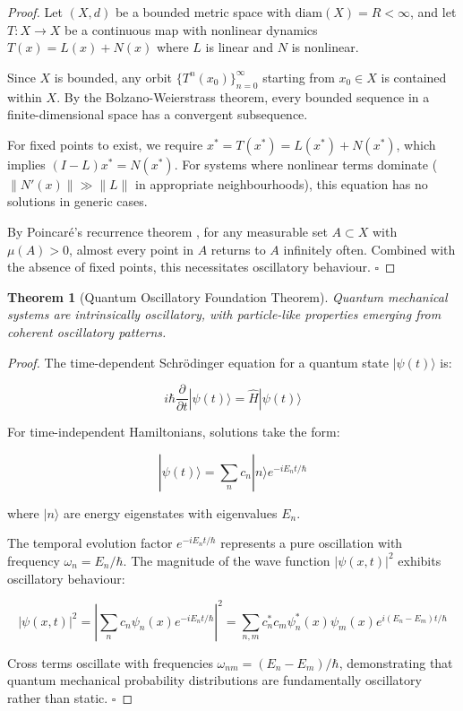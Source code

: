 \documentclass[11pt]{article}
\newtheorem{theorem}{Theorem}[section]
\theoremstyle{remark}
\begin{document}
\begin{proof}
Let $(X, d)$ be a bounded metric space with $\text{diam}(X) = R < \infty$, and let $T: X \to X$ be a continuous map with nonlinear dynamics $T(x) = L(x) + N(x)$ where $L$ is linear and $N$ is nonlinear.

Since $X$ is bounded, any orbit $\{T^n(x_0)\}_{n=0}^{\infty}$ starting from $x_0 \in X$ is contained within $X$. By the Bolzano-Weierstrass theorem, every bounded sequence in a finite-dimensional space has a convergent subsequence.

For fixed points to exist, we require $x^* = T(x^*) = L(x^*) + N(x^*)$, which implies $(I - L)x^* = N(x^*)$. For systems where nonlinear terms dominate ($\|N'(x)\| \gg \|L\|$ in appropriate neighbourhoods), this equation has no solutions in generic cases.

By Poincaré's recurrence theorem \cite{poincare1890probleme}, for any measurable set $A \subset X$ with $\mu(A) > 0$, almost every point in $A$ returns to $A$ infinitely often. Combined with the absence of fixed points, this necessitates oscillatory behaviour. $\square$
\end{proof}

\begin{theorem}[Quantum Oscillatory Foundation Theorem]
Quantum mechanical systems are intrinsically oscillatory, with particle-like properties emerging from coherent oscillatory patterns.
\end{theorem}

\begin{proof}
The time-dependent Schrödinger equation \cite{dirac1958quantum} for a quantum state $|\psi(t)\rangle$ is:

$$i\hbar \frac{\partial}{\partial t}|\psi(t)\rangle = \hat{H}|\psi(t)\rangle$$

For time-independent Hamiltonians, solutions take the form:

$$|\psi(t)\rangle = \sum_n c_n |n\rangle e^{-iE_n t/\hbar}$$

where $|n\rangle$ are energy eigenstates with eigenvalues $E_n$.

The temporal evolution factor $e^{-iE_n t/\hbar}$ represents a pure oscillation with frequency $\omega_n = E_n/\hbar$. The magnitude of the wave function $|\psi(x,t)|^2$ exhibits oscillatory behaviour:

$$|\psi(x,t)|^2 = \left|\sum_n c_n \psi_n(x) e^{-iE_n t/\hbar}\right|^2 = \sum_{n,m} c_n^* c_m \psi_n^*(x) \psi_m(x) e^{i(E_n - E_m)t/\hbar}$$

Cross terms oscillate with frequencies $\omega_{nm} = (E_n - E_m)/\hbar$, demonstrating that quantum mechanical probability distributions are fundamentally oscillatory rather than static. $\square$
\end{proof}
\end{document}
